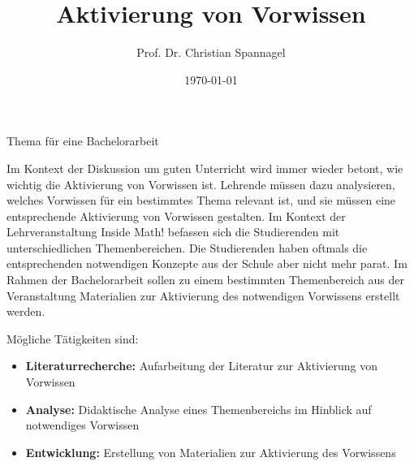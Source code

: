 \documentclass{cssheet}
\title{Aktivierung von Vorwissen}
\author{Prof. Dr. Christian Spannagel}
\date{\today}
\begin{document}
\vspace*{5mm}
\begin{center}
{\Large Thema für eine Bachelorarbeit}
\end{center}

\printtitle
\vspace*{1cm}

Im Kontext der Diskussion um guten Unterricht wird immer wieder betont, wie wichtig die Aktivierung von Vorwissen ist. Lehrende müssen dazu analysieren, welches Vorwissen für ein bestimmtes Thema relevant ist, und sie müssen eine entsprechende Aktivierung von Vorwissen gestalten. Im Kontext der Lehrveranstaltung \glqq{}Inside Math!\grqq{} befassen sich die Studierenden mit unterschiedlichen Themenbereichen. Die Studierenden haben oftmals die entsprechenden notwendigen Konzepte aus der Schule aber nicht mehr parat. Im Rahmen der Bachelorarbeit sollen zu einem bestimmten Themenbereich aus der Veranstaltung Materialien zur Aktivierung des notwendigen Vorwissens erstellt werden.

Mögliche Tätigkeiten sind:
\begin{itemize}
\item \textbf{Literaturrecherche:} Aufarbeitung der Literatur zur Aktivierung von Vorwissen
\item \textbf{Analyse:} Didaktische Analyse eines Themenbereichs im Hinblick auf notwendiges Vorwissen
\item \textbf{Entwicklung:} Erstellung von Materialien zur Aktivierung des Vorwissens
\end{itemize}

\vspace*{10mm}

\printlicense

\printsocials
\end{document}
